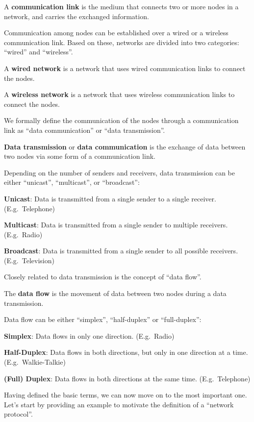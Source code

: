 A \textbf{communication link} is the medium that connects two or more nodes in a network, and carries the exchanged
information.
\ed

Communication among nodes can be established over a wired or a wireless communication link. Based on these, networks
are divided into two categories: ``wired'' and ``wireless''.

A \textbf{wired network} is a network that uses wired communication links to connect the nodes.
\ed

A \textbf{wireless network} is a network that uses wireless communication links to connect the nodes.
\ed

We formally define the communication of the nodes through a communication link as ``data communication'' or ``data
transmission''.

\textbf{Data transmission} or \textbf{data communication} is the exchange of data between two nodes via some form of a
communication link.
\ed

Depending on the number of  senders and receivers, data transmission can be either ``unicast'', ``multicast'', or
``broadcast'':
\bit
\item \textbf{Unicast}: Data is transmitted from a single sender to a single receiver. (E.g.\ Telephone)
\item \textbf{Multicast}: Data is transmitted from a single sender to multiple receivers. (E.g.\ Radio)
\item \textbf{Broadcast}: Data is transmitted from a single sender to all possible receivers. (E.g.\ Television)
\eit

Closely related to data transmission is the concept of ``data flow''.

The \textbf{data flow} is the movement of data between two nodes during a data transmission.
\ed

Data flow can be either ``simplex'', ``half-duplex'' or ``full-duplex'':
\bit
\item \textbf{Simplex}: Data flows in only one direction. (E.g.\ Radio)
\item \textbf{Half-Duplex}: Data flows in both directions, but only in one direction at a time. (E.g.\ Walkie-Talkie)
\item \textbf{(Full) Duplex}: Data flows in both directions at the same time. (E.g.\ Telephone)
\eit

Having defined the basic terms, we can now move on to the most important one. Let's start by providing an example to
motivate the definition of a ``network protocol''.

